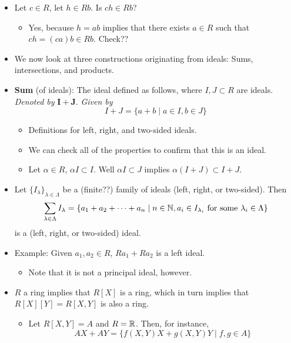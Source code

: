 \documentclass[../notes.tex]{subfiles}
\begin{document}
\begin{itemize}
    \item Let $c\in R$, let $h\in Rb$. Is $ch\in Rb$?
    \begin{itemize}
        \item Yes, because $h=ab$ implies that there exists $a\in R$ such that $ch=(ca)b\in Rb$. Check??
    \end{itemize}
    \item We now look at three constructions originating from ideals: Sums, intersections, and products.
    \item \textbf{Sum} (of ideals): The ideal defined as follows, where $I,J\subset R$ are ideals. \emph{Denoted by} $\bm{I+J}$. \emph{Given by}
    \begin{equation*}
        I+J = \{a+b\mid a\in I,b\in J\}
    \end{equation*}
    \begin{itemize}
        \item Definitions for left, right, and two-sided ideals.
        \item We can check all of the properties to confirm that this is an ideal.
        \item Let $\alpha\in R$, $\alpha I\subset I$.  Well $\alpha I\subset J$ implies $\alpha(I+J)\subset I+J$.
    \end{itemize}
    \item Let $\{I_\lambda\}_{\lambda\in\Lambda}$ be a (finite??) family of ideals (left, right, or two-sided). Then
    \begin{equation*}
        \sum_{\lambda\in\Lambda}I_\lambda = \{a_1+a_2+\cdots+a_n\mid n\in\mathbb{N},a_i\in I_{\lambda_i}\text{ for some }\lambda_i\in\Lambda\}
    \end{equation*}
    is a (left, right, or two-sided) ideal.
    \item Example: Given $a_1,a_2\in R$, $Ra_1+Ra_2$ is a left ideal.
    \begin{itemize}
        \item Note that it is not a principal ideal, however.
    \end{itemize}
    \item $R$ a ring implies that $R[X]$ is a ring, which in turn implies that $R[X][Y]=R[X,Y]$ is also a ring.
    \begin{itemize}
        \item Let $R[X,Y]=A$ and $R=\mathbb{R}$. Then, for instance,
        \begin{equation*}
            AX+AY = \{f(X,Y)X+g(X,Y)Y\mid f,g\in A\}
        \end{equation*}

\end{itemize}
\end{itemize}
\end{document}
